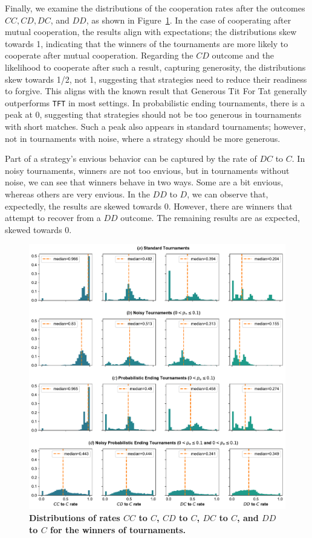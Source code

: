 \documentclass{article}
\def\TFT{\texttt{TFT}}
\begin{document}
Finally, we examine the distributions of the cooperation rates after the
outcomes \(CC, CD, DC\), and \(DD\), as shown in
Figure~\ref{fig:discussion_rates}. In the case of cooperating after mutual
cooperation, the results align with expectations; the distributions skew towards
1, indicating that the winners of the tournaments are more likely to cooperate
after mutual cooperation. Regarding the \(CD\) outcome and the likelihood to
cooperate after such a result, capturing generosity, the distributions skew
towards 1/2, not 1, suggesting that strategies need to reduce their readiness to
forgive. This aligns with the known result that Generous Tit For Tat generally
outperforms \TFT{} in most settings. In probabilistic ending tournaments, there
is a peak at 0, suggesting that strategies should not be too generous in
tournaments with short matches. Such a peak also appears in standard
tournaments; however, not in tournaments with noise, where a strategy should be
more generous.

Part of a strategy's envious behavior can be captured by the rate of \(DC\) to
\(C\). In noisy tournaments, winners are not too envious, but in tournaments
without noise, we can see that winners behave in two ways. Some are a bit
envious, whereas others are very envious. In the \(DD\) to \(D\), we can observe
that, expectedly, the results are skewed towards 0. However, there are winners
that attempt to recover from a \(DD\) outcome. The remaining results are as
expected, skewed towards 0.

\begin{figure}[!htbp]
    \centering
        \centering
        \includegraphics[width=\textwidth]{../images/rates_result.pdf}
        \caption{\textbf{Distributions of rates $CC$ to $C$, $CD$ to $C$, $DC$
        to $C$, and $DD$ to $C$ for the winners of
        tournaments.}}\label{fig:discussion_rates}
\end{figure}
\end{document}
